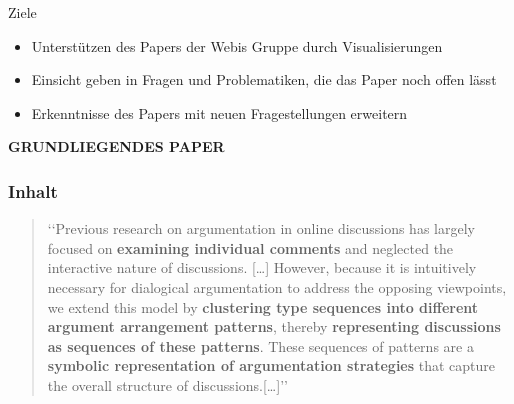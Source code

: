 \documentclass[compress,12pt]{beamer}
\begin{document}
    \begin{frame}{Ziele}
        \begin{itemize}
            \item Unterstützen des Papers der Webis Gruppe durch Visualisierungen
            \item Einsicht geben in Fragen und Problematiken, die das Paper noch offen lässt
            \item Erkenntnisse des Papers mit neuen Fragestellungen erweitern
        \end{itemize}
    \end{frame}

    \End

    \begin{frame}
        \centering
        \textbf{GRUNDLIEGENDES PAPER}
    \end{frame}


    \begin{frame}
        \frametitle{Inhalt}
        {\small
            \begin{quote}
                \lq\lq{}Previous research on argumentation in online discussions has largely focused on \textbf{examining individual comments} and neglected the interactive nature of discussions.
                [\ldots] However, because it is intuitively necessary for dialogical argumentation to address the opposing viewpoints, we extend this model by \textbf{clustering type sequences into different argument arrangement patterns}, thereby \textbf{representing discussions as sequences of these patterns}.
                These sequences of patterns are a \textbf{symbolic representation of argumentation strategies} that capture the overall structure of discussions.[\ldots]\rq\rq{}
            \end{quote}}
    \end{frame}
\end{document}
